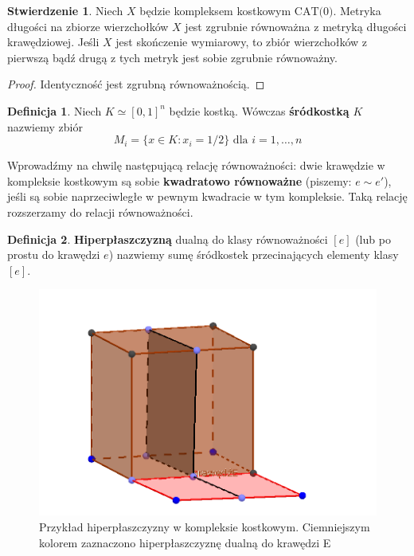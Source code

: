 \documentclass[licencjacka]{pracamgr}
\theoremstyle{definition}
\newtheorem{definition}{Definicja}[section]
\theoremstyle{definition}
\theoremstyle{definition}
\newtheorem{proposition}{Stwierdzenie}[section]
\theoremstyle{definition}
\theoremstyle{definition}
\theoremstyle{plain}
\theoremstyle{plain}
\begin{document}
\begin{proposition}
	Niech $ X $ będzie kompleksem kostkowym $ \text{CAT(0)}$. Metryka długości na 
	zbiorze wierzchołków $ X $ jest zgrubnie równoważna z metryką długości krawędziowej.
	Jeśli $ X $ jest skończenie wymiarowy, to zbiór wierzchołków z pierwszą bądź drugą z 
	tych metryk jest sobie zgrubnie równoważny.
\end{proposition}
\begin{proof}
	Identyczność jest zgrubną równoważnością.
\end{proof}

\begin{definition}
	Niech $ K \simeq [0,1]^n $ będzie kostką. Wówczas \textbf{śródkostką} $ K $ nazwiemy 
	zbiór
	$$ M_i = \{ x \in K : x_i = 1/2 \} \text{ dla } i = 1,\dots,n $$
\end{definition}
Wprowadźmy na chwilę następującą relację równoważności: dwie krawędzie w kompleksie 
kostkowym są sobie \textbf{kwadratowo równoważne} (piszemy: $ e \sim e' $), jeśli 
są sobie naprzeciwległe w pewnym kwadracie w tym kompleksie. Taką relację rozszerzamy do 
relacji równoważności.
\begin{definition}
	\textbf{Hiperpłaszczyzną} dualną do klasy równoważności $ [e] $ (lub po prostu do 
	krawędzi $ e $) nazwiemy sumę śródkostek przecinających elementy klasy $ [e] $.
\end{definition}

\begin{figure}
	\caption{\small{Przykład hiperpłaszczyzny w kompleksie kostkowym. Ciemniejszym kolorem
	zaznaczono hiperpłaszczyznę dualną do krawędzi E}}
	\centering
	\includegraphics{hiper}
\end{figure}
\end{document}
